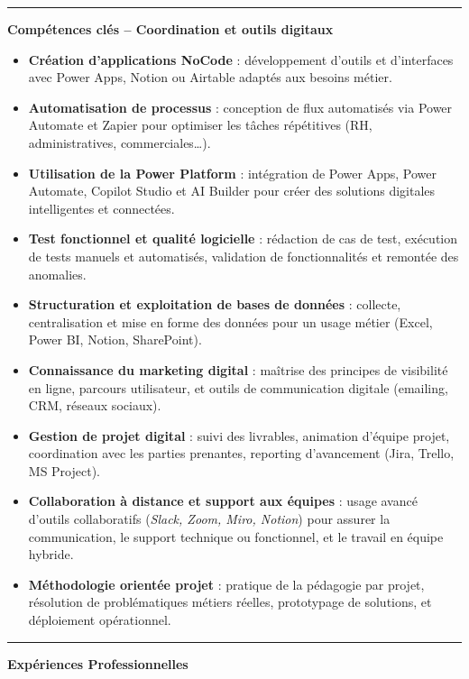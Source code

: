 \documentclass[11pt,a4paper]{article}
\newcommand{\cvsection}[1]{%
  \vspace{0pt}
  \noindent
  \textcolor{accentcolor}{\rule{2cm}{1.5pt}}\hspace{0.5em}
  {\large\bfseries\color{accentcolor}#1}
  \vspace{0.5em}
  \par\nobreak
}
\begin{document}
\cvsection{Compétences clés – Coordination et outils digitaux}
\begin{itemize}
    \item \textbf{Création d'applications NoCode} : développement d'outils et d’interfaces avec Power Apps, Notion ou Airtable adaptés aux besoins métier.
    
    \item \textbf{Automatisation de processus} : conception de flux automatisés via Power Automate et Zapier pour optimiser les tâches répétitives (RH, administratives, commerciales…).
    
    \item \textbf{Utilisation de la Power Platform} : intégration de Power Apps, Power Automate, Copilot Studio et AI Builder pour créer des solutions digitales intelligentes et connectées.
    
    \item \textbf{Test fonctionnel et qualité logicielle} : rédaction de cas de test, exécution de tests manuels et automatisés, validation de fonctionnalités et remontée des anomalies.
    
    \item \textbf{Structuration et exploitation de bases de données} : collecte, centralisation et mise en forme des données pour un usage métier (Excel, Power BI, Notion, SharePoint).
    
    \item \textbf{Connaissance du marketing digital} : maîtrise des principes de visibilité en ligne, parcours utilisateur, et outils de communication digitale (emailing, CRM, réseaux sociaux).
    
    \item \textbf{Gestion de projet digital} : suivi des livrables, animation d’équipe projet, coordination avec les parties prenantes, reporting d’avancement (Jira, Trello, MS Project).
    
    \item \textbf{Collaboration à distance et support aux équipes} : usage avancé d’outils collaboratifs (\textit{Slack, Zoom, Miro, Notion}) pour assurer la communication, le support technique ou fonctionnel, et le travail en équipe hybride.
    
    \item \textbf{Méthodologie orientée projet} : pratique de la pédagogie par projet, résolution de problématiques métiers réelles, prototypage de solutions, et déploiement opérationnel.
\end{itemize}
\newpage
\cvsection{Expériences Professionnelles}
\end{document}
